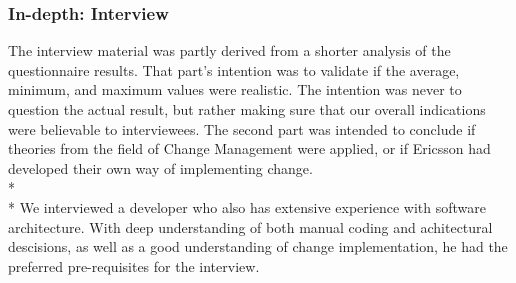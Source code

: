 \documentclass[final_report_innit.tex]{subfiles}
\begin{document}
\subsubsection{In-depth: Interview}
The interview material was partly derived from a shorter analysis of the questionnaire results. That part's intention was to validate if the average, minimum, and maximum values were realistic. The intention was never to question the actual result, but rather making sure that our overall indications were believable to interviewees. The second part was intended to conclude if theories from the field of Change Management were applied, or if Ericsson had developed their own way of implementing change.
\\*
\\*
We interviewed a developer who also has extensive experience with software architecture. With deep understanding of both manual coding and achitectural descisions, as well as a good understanding of change implementation, he had the preferred pre-requisites for the interview.
\end{document}
